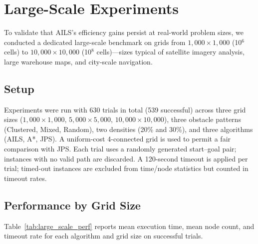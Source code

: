 \documentclass[journal]{IEEEtran}
\begin{document}
\section{Large-Scale Experiments}
\label{sec:large_scale}

To validate that AILS's efficiency gains persist at real-world problem sizes, we conducted a dedicated large-scale benchmark on grids from $1{,}000{\times}1{,}000$ (10$^6$ cells) to $10{,}000{\times}10{,}000$ (10$^8$ cells)---sizes typical of satellite imagery analysis, large warehouse maps, and city-scale navigation.

\subsection{Setup}

Experiments were run with 630 trials in total (539 successful) across three grid sizes ($1{,}000{\times}1{,}000$, $5{,}000{\times}5{,}000$, $10{,}000{\times}10{,}000$), three obstacle patterns (Clustered, Mixed, Random), two densities (20\% and 30\%), and three algorithms (AILS, A*, JPS).
A uniform-cost 4-connected grid is used to permit a fair comparison with JPS.
Each trial uses a randomly generated start--goal pair; instances with no valid path are discarded.
A 120-second timeout is applied per trial; timed-out instances are excluded from time/node statistics but counted in timeout rates.

\subsection{Performance by Grid Size}

Table~\ref{tab:large_scale_perf} reports mean execution time, mean node count, and timeout rate for each algorithm and grid size on successful trials.
\end{document}

